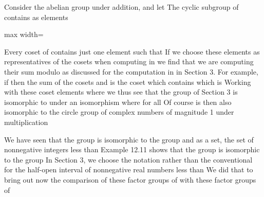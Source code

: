 \documentclass[11pt,oneside]{article}
\begin{document}
\begin{BookBody}

 Consider the abelian group  under addition, and let  The cyclic subgroup  of  contains as elements

\begin{center}\begin{adjustbox}{max width=\linewidth}\end{adjustbox}\end{center}

\noindent Every coset of  contains just one element  such that  If we choose these elements as representatives of the cosets when computing in  we find that we are computing their sum modulo  as discussed for the computation in  in Section 3. For example, if  then the sum of the cosets  and  is the coset  which contains  which is  Working with these coset elements  where  we thus see that the group  of Section 3 is isomorphic to  under an isomorphism \BookInline{\psi } where  for all  Of course is then also isomorphic to the circle group  of complex numbers of magnitude 1 under multiplication\BookEnd{\blacktriangle}

We have seen that the group  is isomorphic to the group  and as a set,  the set of nonnegative integers less than  Example 12.11 shows that the group  is isomorphic to the group  In Section 3, we choose the notation  rather than the conventional \BookInline{[0,\allowbreak c)} for the half-open interval of nonnegative real numbers less than  We did that to bring out now the comparison of these factor groups of  with these factor groups of 


\end{BookBody}
\end{document}
